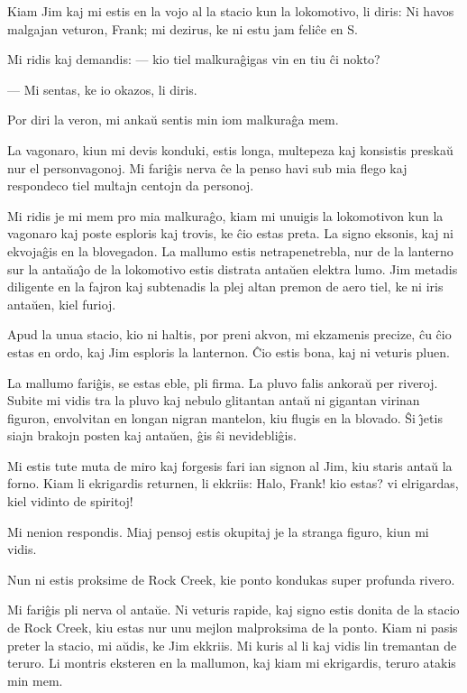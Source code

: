    Kiam Jim kaj mi estis en la vojo al la stacio kun la lokomotivo, li
diris: Ni havos malgajan veturon, Frank; mi dezirus, ke ni estu jam
feli\^ce en S.

   Mi ridis kaj demandis: --- kio tiel malkura\^gigas vin en tiu \^ci
nokto?

 --- Mi sentas, ke io okazos, li diris.

   Por diri la veron, mi anka\u u sentis min iom malkura\^ga mem.

   La vagonaro, kiun mi devis konduki, estis longa, multepeza kaj
konsistis preska\u u nur el personvagonoj. Mi fari\^gis nerva \^ce
la penso havi sub mia flego kaj respondeco tiel multajn centojn da
personoj.

   Mi ridis je mi mem pro mia malkura\^go, kiam mi unuigis la lokomotivon
kun la vagonaro kaj poste esploris kaj trovis, ke \^cio estas preta.
La signo eksonis, kaj ni ekvoja\^gis en la blovegadon. La mallumo
estis netrapenetrebla, nur de la lanterno sur la anta\u ua\^{\j}o de
la lokomotivo estis distrata anta\u uen elektra lumo. Jim metadis
diligente en la fajron kaj subtenadis la plej altan premon de aero
tiel, ke ni iris anta\u uen, kiel furioj.

   Apud la unua stacio, kio ni haltis, por preni akvon, mi ekzamenis
precize, \^cu \^cio estas en ordo, kaj Jim esploris la lanternon.
\^Cio estis bona, kaj ni veturis pluen.

   La mallumo fari\^gis, se estas eble, pli firma. La pluvo falis
ankora\u u per riveroj. Subite mi vidis tra la pluvo kaj nebulo
glitantan anta\u u ni gigantan virinan figuron, envolvitan en longan
nigran mantelon, kiu flugis en la blovado. \^Si \^{\j}etis siajn
brakojn posten kaj anta\u uen, \^gis \^si nevidebli\^gis.

   Mi estis tute muta de miro kaj forgesis fari ian signon al Jim, kiu
staris anta\u u la forno. Kiam li ekrigardis returnen, li ekkriis:
Halo, Frank! kio estas? vi elrigardas, kiel vidinto de spiritoj!

   Mi nenion respondis. Miaj pensoj estis okupitaj je la stranga figuro,
kiun mi vidis.

   Nun ni estis proksime de Rock Creek, kie ponto kondukas super
profunda rivero.

   Mi fari\^gis pli nerva ol anta\u ue. Ni veturis rapide, kaj signo estis
donita de la stacio de Rock Creek, kiu estas nur unu mejlon
malproksima de la ponto. Kiam ni pasis preter la stacio, mi a\u
udis, ke Jim ekkriis. Mi kuris al li kaj vidis lin tremantan de
teruro. Li montris eksteren en la mallumon, kaj kiam mi ekrigardis,
teruro atakis min mem.

